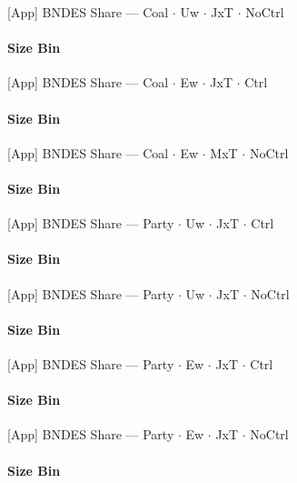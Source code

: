 \documentclass[aspectratio=169,10pt]{beamer}
\newcommand{\tsize}{../tables/agg_firm_size_bin}
\begin{document}
\begin{frame}[t,shrink=5]{[App] BNDES Share --- Coal $\cdot$ Uw $\cdot$ JxT $\cdot$ NoCtrl}
\framesubtitle{Size Bin}
\begin{center}\footnotesize

\end{center}
\end{frame}

\begin{frame}[t,shrink=5]{[App] BNDES Share --- Coal $\cdot$ Ew $\cdot$ JxT $\cdot$ Ctrl}
\framesubtitle{Size Bin}
\begin{center}\footnotesize

\end{center}
\end{frame}

\begin{frame}[t,shrink=5]{[App] BNDES Share --- Coal $\cdot$ Ew $\cdot$ MxT $\cdot$ NoCtrl}
\framesubtitle{Size Bin}
\begin{center}\footnotesize

\end{center}
\end{frame}

\begin{frame}[t,shrink=5]{[App] BNDES Share --- Party $\cdot$ Uw $\cdot$ JxT $\cdot$ Ctrl}
\framesubtitle{Size Bin}
\begin{center}\footnotesize

\end{center}
\end{frame}

\begin{frame}[t,shrink=5]{[App] BNDES Share --- Party $\cdot$ Uw $\cdot$ JxT $\cdot$ NoCtrl}
\framesubtitle{Size Bin}
\begin{center}\footnotesize

\end{center}
\end{frame}

\begin{frame}[t,shrink=5]{[App] BNDES Share --- Party $\cdot$ Ew $\cdot$ JxT $\cdot$ Ctrl}
\framesubtitle{Size Bin}
\begin{center}\footnotesize

\end{center}
\end{frame}

\begin{frame}[t,shrink=5]{[App] BNDES Share --- Party $\cdot$ Ew $\cdot$ JxT $\cdot$ NoCtrl}
\framesubtitle{Size Bin}
\begin{center}\footnotesize

\end{center}
\end{frame}
\end{document}
